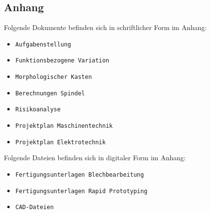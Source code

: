 \newpage
\begin{appendix}
\section{Anhang}
Folgende Dokumente befinden sich in schriftlicher Form im Anhang:

\begin{itemize}
	\item \verb|Aufgabenstellung|
	\item \verb|Funktionsbezogene Variation|
	\item \verb|Morphologischer Kasten|	
	\item \verb|Berechnungen Spindel|
	\item \verb|Risikoanalyse|
	\item \verb|Projektplan Maschinentechnik|
	\item \verb|Projektplan Elektrotechnik|	
	
	
\end{itemize}

Folgende Dateien befinden sich in digitaler Form im Anhang:

\begin{itemize}
	\item \verb|Fertigungsunterlagen Blechbearbeitung|
	\item \verb|Fertigungsunterlagen Rapid Prototyping|
	\item \verb|CAD-Dateien|	
	
\end{itemize}



\end{appendix}